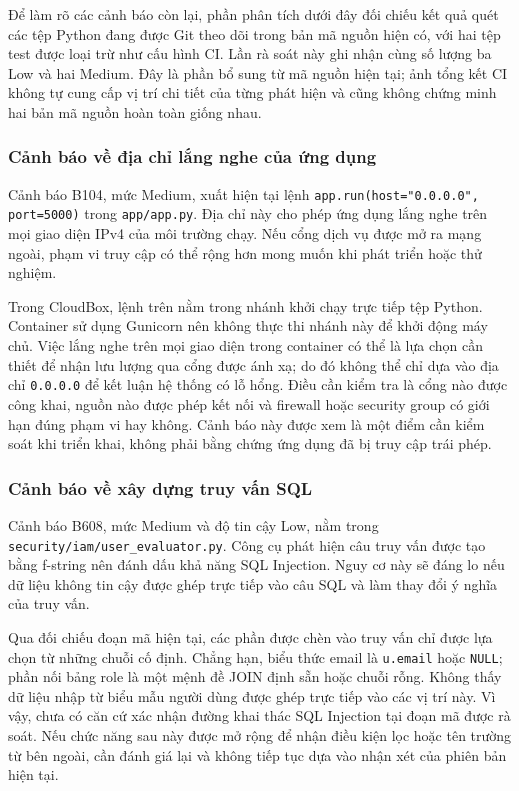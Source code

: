 Để làm rõ các cảnh báo còn lại, phần phân tích dưới đây đối chiếu kết quả quét các tệp Python đang được Git theo dõi trong bản mã nguồn hiện có, với hai tệp test được loại trừ như cấu hình CI. Lần rà soát này ghi nhận cùng số lượng ba Low và hai Medium. Đây là phần bổ sung từ mã nguồn hiện tại; ảnh tổng kết CI không tự cung cấp vị trí chi tiết của từng phát hiện và cũng không chứng minh hai bản mã nguồn hoàn toàn giống nhau.

\subsubsection{Cảnh báo về địa chỉ lắng nghe của ứng dụng}
Cảnh báo B104, mức Medium, xuất hiện tại lệnh \texttt{app.run(host="0.0.0.0", port=5000)} trong \nolinkurl{app/app.py}. Địa chỉ này cho phép ứng dụng lắng nghe trên mọi giao diện IPv4 của môi trường chạy. Nếu cổng dịch vụ được mở ra mạng ngoài, phạm vi truy cập có thể rộng hơn mong muốn khi phát triển hoặc thử nghiệm.

Trong CloudBox, lệnh trên nằm trong nhánh khởi chạy trực tiếp tệp Python. Container sử dụng Gunicorn nên không thực thi nhánh này để khởi động máy chủ. Việc lắng nghe trên mọi giao diện trong container có thể là lựa chọn cần thiết để nhận lưu lượng qua cổng được ánh xạ; do đó không thể chỉ dựa vào địa chỉ \texttt{0.0.0.0} để kết luận hệ thống có lỗ hổng. Điều cần kiểm tra là cổng nào được công khai, nguồn nào được phép kết nối và firewall hoặc security group có giới hạn đúng phạm vi hay không. Cảnh báo này được xem là một điểm cần kiểm soát khi triển khai, không phải bằng chứng ứng dụng đã bị truy cập trái phép.

\subsubsection{Cảnh báo về xây dựng truy vấn SQL}
Cảnh báo B608, mức Medium và độ tin cậy Low, nằm trong \nolinkurl{security/iam/user_evaluator.py}. Công cụ phát hiện câu truy vấn được tạo bằng f-string nên đánh dấu khả năng SQL Injection. Nguy cơ này sẽ đáng lo nếu dữ liệu không tin cậy được ghép trực tiếp vào câu SQL và làm thay đổi ý nghĩa của truy vấn.

Qua đối chiếu đoạn mã hiện tại, các phần được chèn vào truy vấn chỉ được lựa chọn từ những chuỗi cố định. Chẳng hạn, biểu thức email là \texttt{u.email} hoặc \texttt{NULL}; phần nối bảng role là một mệnh đề JOIN định sẵn hoặc chuỗi rỗng. Không thấy dữ liệu nhập từ biểu mẫu người dùng được ghép trực tiếp vào các vị trí này. Vì vậy, chưa có căn cứ xác nhận đường khai thác SQL Injection tại đoạn mã được rà soát. Nếu chức năng sau này được mở rộng để nhận điều kiện lọc hoặc tên trường từ bên ngoài, cần đánh giá lại và không tiếp tục dựa vào nhận xét của phiên bản hiện tại.

